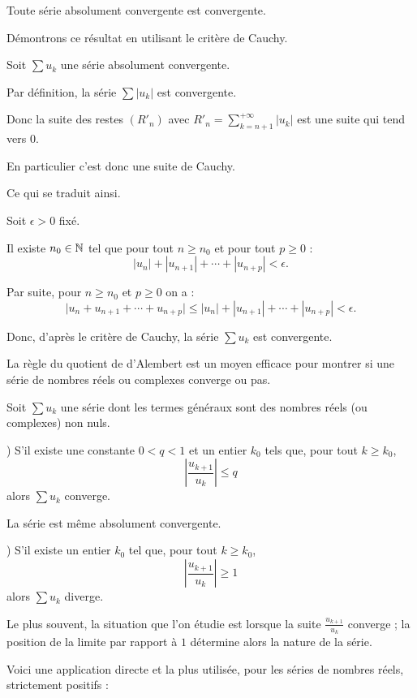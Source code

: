 Toute série absolument convergente est convergente.

\change
Démontrons ce résultat en utilisant le critère de Cauchy. 

Soit $\sum u_k$ une série absolument convergente.

\change
Par définition, la série $\sum |u_k|$ est convergente.

\change
Donc la suite des restes $(R'_n)$ avec $R'_n = \displaystyle\sum_{k=n+1}^{+\infty} |u_k|$ est une suite qui tend vers $0$.

\change
En particulier c'est donc une suite de Cauchy.

\change
Ce qui se traduit ainsi.

Soit $\epsilon>0$ fixé. 

\change
Il existe $n_0 \in \mathbb{N}$ tel que pour tout $n \ge n_0$ et pour tout $p \ge 0$ :
$$|u_n|+|u_{n+1}|+\cdots+|u_{n+p}| < \epsilon.$$

\change
Par suite, pour $n \ge n_0$ et  $p \ge 0$ on a :
$$\big|u_n+u_{n+1}+\cdots+u_{n+p}\big| \le |u_n|+|u_{n+1}|+\cdots+|u_{n+p}| < \epsilon.$$

\change
Donc, d'après le critère de Cauchy, la série $\sum u_k$ est convergente.

\diapo

La règle du quotient de d'Alembert est un moyen efficace pour montrer 
si une série de nombres réels ou complexes converge ou pas.

\change
Soit $\sum u_k$ une série dont les termes généraux sont des nombres réels (ou complexes) non nuls.

) S'il existe une constante $0<q<1$ et un entier $k_0$ tels que, pour tout
$k \ge k_0$,  
$$
\left|\frac{u_{k+1}}{u_k}\right| \le q $$
alors $\sum u_k$ converge.

\change
La série est même absolument convergente.

) S'il existe un entier $k_0$ tel que, pour tout $k \ge k_0$, 
$$
\left|\frac{u_{k+1}}{u_k}\right| \ge 1
$$
alors $\sum u_k$ diverge.

\diapo

Le plus souvent, la situation que l'on étudie est lorsque 
la suite $\frac{u_{k+1}}{u_k}$ converge ; la position
de la limite par rapport à $1$ détermine alors la nature de la série.

\change
Voici une application directe et la plus utilisée, 
pour les séries de nombres réels, strictement positifs :

